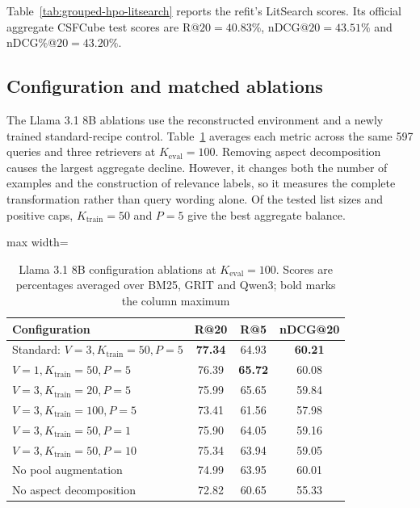 \documentclass[pdflatex,sn-basic,Numbered]{sn-jnl}%
\theoremstyle{thmstyleone}%
\theoremstyle{thmstyletwo}%
\theoremstyle{thmstylethree}%
\begin{document}
Table~\ref{tab:grouped-hpo-litsearch} reports the refit's LitSearch scores.
Its official aggregate CSFCube test scores are R@$20=40.83\%$,
nDCG@$20=43.51\%$ and nDCG\%@$20=43.20\%$.

\subsection{Configuration and matched ablations}
\label{sec:revision-ablations}
The Llama 3.1 8B ablations use the reconstructed environment and a newly trained
standard-recipe control. Table~\ref{tab:litsearch-ablation-main} averages each
metric across the same 597 queries and three retrievers at
$K_{\mathrm{eval}}=100$. Removing aspect decomposition causes the largest
aggregate decline. However, it changes both the number of examples and the
construction of relevance labels, so it measures the complete transformation
rather than query wording alone. Of the tested list sizes and positive caps,
$K_{\mathrm{train}}=50$ and $P=5$ give the best aggregate balance.

\begin{table}[ht]


\centering
\scriptsize
\setlength{\tabcolsep}{3.2pt}
\renewcommand{\arraystretch}{1.08}
\begin{adjustbox}{max width=\linewidth}
\begin{tabular}{l c c c}
\hline
Configuration & R@20 & R@5 & nDCG@20 \\
\hline
Standard: $V=3,K_{\mathrm{train}}=50,P=5$ & \textbf{77.34} & 64.93 & \textbf{60.21} \\
$V=1,K_{\mathrm{train}}=50,P=5$ & 76.39 & \textbf{65.72} & 60.08 \\
$V=3,K_{\mathrm{train}}=20,P=5$ & 75.99 & 65.65 & 59.84 \\
$V=3,K_{\mathrm{train}}=100,P=5$ & 73.41 & 61.56 & 57.98 \\
$V=3,K_{\mathrm{train}}=50,P=1$ & 75.90 & 64.05 & 59.16 \\
$V=3,K_{\mathrm{train}}=50,P=10$ & 75.34 & 63.94 & 59.05 \\
No pool augmentation & 74.99 & 63.95 & 60.01 \\
No aspect decomposition & 72.82 & 60.65 & 55.33 \\
\hline
\end{tabular}
\end{adjustbox}


\caption{Llama 3.1 8B configuration ablations at $K_{\mathrm{eval}}=100$. Scores are percentages averaged over BM25, GRIT and Qwen3; bold marks the column maximum}
\label{tab:litsearch-ablation-main}
\end{table}
\end{document}
